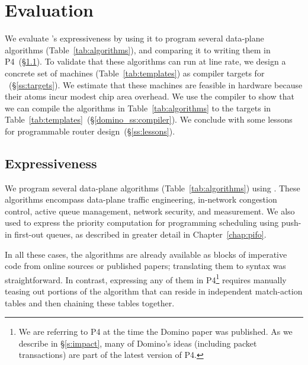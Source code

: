 \section{Evaluation}
\label{s:eval}


We evaluate \pktlanguage's expressiveness by using it to program several
data-plane algorithms (Table~\ref{tab:algorithms}), and comparing it to writing
them in P4~(\S\ref{ss:expressiveness}). To validate that these algorithms can
run at line rate, we design a concrete set of \absmachine machines
(Table~\ref{tab:templates}) as compiler targets for
\pktlanguage~(\S\ref{ss:targets}).  We estimate that these machines are
feasible in hardware because their atoms incur modest chip area overhead.  We
use the \pktlanguage compiler to show that we can compile the algorithms in
Table~\ref{tab:algorithms} to the targets in
Table~\ref{tab:templates}~(\S\ref{domino_ss:compiler}).  We conclude with some
lessons for programmable router design~(\S\ref{ss:lessons}).

\subsection{Expressiveness}
\label{ss:expressiveness}

We program several data-plane algorithms (Table~\ref{tab:algorithms}) using
\pktlanguage. These algorithms encompass data-plane traffic engineering,
in-network congestion control, active queue management, network security, and
measurement. We also used \pktlanguage to express the priority computation for
programming scheduling using push-in first-out queues, as described in greater
detail in Chapter~\ref{chap:pifo}.

In all these cases, the algorithms are already available as blocks of
imperative code from online sources or published papers; translating them to
\pktlanguage syntax was straightforward. In contrast, expressing any of them in
P4\footnote{We are referring to P4 at the time the Domino paper was published.
As we describe in \S\ref{s:impact}, many of Domino's ideas (including packet
transactions) are part of the latest version of P4.} requires manually teasing
out portions of the algorithm that can reside in independent match-action
tables and then chaining these tables together.

